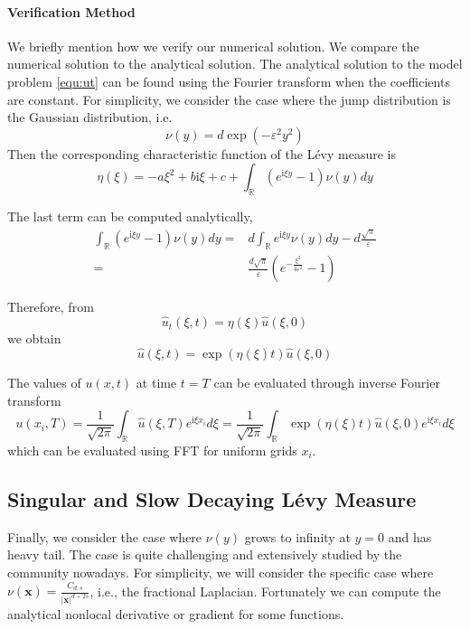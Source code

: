 \documentclass[3p,,preprint,12pt]{elsarticle}
\newcommand{\ii}[0]{\mathrm{i}}
\newcommand{\RR}[0]{\mathbb{R}}
\newcommand{\bx}[0]{\mathbf{x}}
\theoremstyle{definition}
\begin{document}
\paragraph{Verification Method} We briefly mention how we verify our numerical solution. We compare the numerical solution to the analytical solution. The analytical solution to the model problem \cref{equ:ut} can be found using the Fourier transform when the coefficients are constant. For simplicity, we consider the case where the jump distribution is the Gaussian distribution, i.e. 
\begin{equation}
	\nu(y) = d\exp(-\varepsilon^2 y^2)
\end{equation}
Then the corresponding characteristic function of the L\'evy measure is 
\begin{equation}
	\eta(\xi) = -a\xi^2 + b\ii \xi + c + \int_\RR (e^{\ii \xi y}-1)\nu(y)dy
\end{equation}

The last term can be computed analytically,
\begin{align}
	\int_{\RR} {({e^{\ii\xi y}} - 1)} \nu (y)dy =& d\int_{\RR} {{e^{\ii\xi y}}\nu (y)} dy - d\frac{{\sqrt \pi  }}{\varepsilon }\\
	 =&\frac{{ d\sqrt \pi  }}{\varepsilon }\left( {{e^{ - \frac{{{\xi ^2}}}{{4{\varepsilon ^2}}}}} - 1} \right)
\end{align}

Therefore, from 
\begin{equation}
	\hat u_t(\xi, t) = \eta(\xi) \hat u(\xi, 0)
\end{equation}
we obtain
\begin{equation}
	\hat u(\xi, t) = \exp(\eta(\xi)t)\hat u(\xi, 0)
\end{equation}

The values of $u(x,t)$ at time $t=T$ can be evaluated through inverse Fourier transform
\begin{equation}
	u(x_i, T) = \frac{1}{\sqrt{2\pi}}\int_\RR \hat u(\xi, T) e^{\ii \xi x_i} d\xi  = \frac{1}{\sqrt{2\pi}}\int_\RR  \exp(\eta(\xi)t)\hat u(\xi, 0) e^{\ii \xi x_i} d\xi 
\end{equation}
which can be evaluated using FFT for uniform grids $x_i$. 

\subsection{Singular and Slow Decaying L\'evy Measure}

Finally, we consider the case where $\nu(y)$ grows to infinity at $y=0$ and has heavy tail. The case is quite challenging and extensively studied by the community nowadays. For simplicity, we will consider the specific case where $\nu(\bx) = \frac{C_{d, s}}{|\bx|^{d+2s}}$, i.e., the fractional Laplacian. Fortunately we can compute  the analytical nonlocal derivative or gradient for some functions. 
\end{document}
